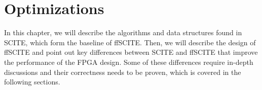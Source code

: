 \chapter{Optimizations}
\label{ch:findings}

In this chapter, we will describe the algorithms and data structures found in \ac{SCITE}, which form the baseline of \ac{ffSCITE}. Then, we will describe the design of \ac{ffSCITE} and point out key differences between \ac{SCITE} and \ac{ffSCITE} that improve the performance of the \ac{FPGA} design. Some of these differences require in-depth discussions and their correctness needs to be proven, which is covered in the following sections.

